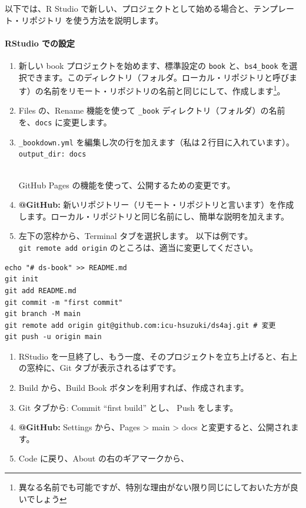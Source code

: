 \documentclass[
]{bxjsbook}
\providecommand{\tightlist}{%
  \setlength{\itemsep}{0pt}\setlength{\parskip}{0pt}}
\theoremstyle{definition}
\theoremstyle{definition}
\theoremstyle{definition}
\theoremstyle{definition}
\theoremstyle{remark}
\begin{document}
以下では、R Studio で新しい、プロジェクトとして始める場合と、テンプレート・リポジトリ を使う方法を説明します。

\hypertarget{rstudio-ux3067ux306eux8a2dux5b9a}{%
\paragraph{RStudio での設定}\label{rstudio-ux3067ux306eux8a2dux5b9a}}

\begin{enumerate}
\def\labelenumi{\arabic{enumi}.}
\tightlist
\item
  新しい book プロジェクトを始めます、標準設定の \texttt{book} と、\texttt{bs4\_book} を選択できます。このディレクトリ（フォルダ。ローカル・リポジトリと呼びます）の名前をリモート・リポジトリの名前と同じにして、作成します\footnote{異なる名前でも可能ですが、特別な理由がない限り同じにしておいた方が良いでしょう}。
\item
  Files の、Rename 機能を使って \texttt{\_book} ディレクトリ（フォルダ）の名前を、\texttt{docs} に変更します。
\item
  \texttt{\_bookdown.yml} を編集し次の行を加えます（私は２行目に入れています）。\\
  \texttt{output\_dir:\ docs}\strut \\
  GitHub Pages の機能を使って、公開するための変更です。
\item
  \textbf{@GitHub:} 新いリポジトリー（リモート・リポジトリと言います）を作成します。ローカル・リポジトリと同じ名前にし、簡単な説明を加えます。
\item
  左下の窓枠から、Terminal タブを選択します。 以下は例です。\texttt{git\ remote\ add\ origin} のところは、適当に変更してください。
\end{enumerate}

\begin{verbatim}
echo "# ds-book" >> README.md
git init
git add README.md
git commit -m "first commit"
git branch -M main
git remote add origin git@github.com:icu-hsuzuki/ds4aj.git # 変更
git push -u origin main
\end{verbatim}

\begin{enumerate}
\def\labelenumi{\arabic{enumi}.}
\setcounter{enumi}{4}
\tightlist
\item
  RStudio を一旦終了し、もう一度、そのプロジェクトを立ち上げると、右上の窓枠に、Git タブが表示されるはずです。
\item
  Build から、Build Book ボタンを利用すれば、作成されます。
\item
  Git タブから: Commit ``first build'' とし、 Push をします。
\item
  \textbf{@GitHub:} Settings から、Pages \textgreater{} main \textgreater{} docs と変更すると、公開されます。
\item
  Code に戻り、About の右のギアマークから、
\end{enumerate}
\end{document}
